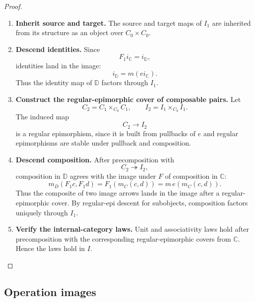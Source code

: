 \begin{proof}
    \leavevmode
    \begin{enumerate}
        \item \textbf{Inherit source and target.}
        The source and target maps of \(I_1\) are inherited from its structure
        as an object over \(C_0\times C_0\).

        \item \textbf{Descend identities.}
        Since
        \[
            F_1i_{\mathbb C}=i_{\mathbb D},
        \]
        identities land in the image:
        \[
            i_{\mathbb D}=m(ei_{\mathbb C}).
        \]
        Thus the identity map of \(\mathbb D\) factors through \(I_1\).

        \item \textbf{Construct the regular-epimorphic cover of composable pairs.}
        Let
        \[
            C_2=C_1\times_{C_0}C_1,
            \qquad
            I_2=I_1\times_{C_0}I_1.
        \]
        The induced map
        \[
            C_2\to I_2
        \]
        is a regular epimorphism, since it is built from pullbacks of \(e\) and
        regular epimorphisms are stable under pullback and composition.

        \item \textbf{Descend composition.}
        After precomposition with
        \[
            C_2\twoheadrightarrow I_2,
        \]
        composition in \(\mathbb D\) agrees with the image under \(F\) of
        composition in \(\mathbb C\):
        \[
            m_D(F_1c,F_1d)
            =
            F_1(m_C(c,d))
            =
            m\,e(m_C(c,d)).
        \]
        Thus the composite of two image arrows lands in the image after a
        regular-epimorphic cover. By regular-epi descent for subobjects,
        composition factors uniquely through \(I_1\).

        \item \textbf{Verify the internal-category laws.}
        Unit and associativity laws hold after precomposition with the
        corresponding regular-epimorphic covers from \(\mathbb C\). Hence the
        laws hold in \(I\).
    \end{enumerate}
\end{proof}

\subsection{Operation images}
\label{subsec:operation-images}

